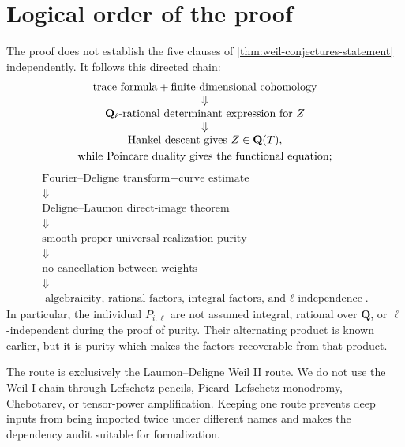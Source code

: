 \section{Logical order of the proof}

The proof does not establish the five clauses of
\cref{thm:weil-conjectures-statement} independently.
It follows this directed chain:
\[
\begin{array}{c}
\text{trace formula}+\text{finite-dimensional cohomology}\\
\Downarrow\\
\text{\(\mathbf Q_\ell\)-rational determinant expression for }Z\\
\Downarrow\\
\text{Hankel descent gives }Z\in\mathbf Q(T),\\[1mm]
\text{while Poincare duality gives the functional equation};
\end{array}
\]
\[
\begin{array}{c}
\text{Fourier--Deligne transform}+\text{curve estimate}\\
\Downarrow\\
\text{Deligne--Laumon direct-image theorem}\\
\Downarrow\\
\text{smooth-proper universal realization-purity}\\
\Downarrow\\
\text{no cancellation between weights}\\
\Downarrow\\
\text{algebraicity, rational factors, integral factors,
and \(\ell\)-independence}.
\end{array}
\]
In particular, the individual \(P_{i,\ell}\) are not assumed integral,
rational over \(\mathbf Q\), or \(\ell\)-independent during the proof of
purity.  Their alternating product is known earlier, but it is purity
which makes the factors recoverable from that product.

The route is exclusively the Laumon--Deligne Weil II route.  We do not
use the Weil I chain through Lefschetz pencils, Picard--Lefschetz
monodromy, Chebotarev, or tensor-power amplification.  Keeping one route
prevents deep inputs from being imported twice under different names and
makes the dependency audit suitable for formalization.

